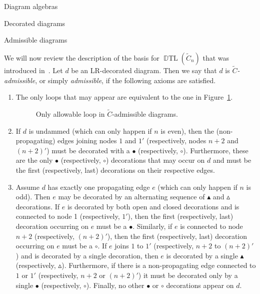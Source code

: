 \documentclass[11pt]{amsart}
\theoremstyle{definition}
\numberwithin{equation}{section}
\newcommand{\C}{\widetilde{C}}
\newcommand{\wtri}{\vartriangle}
\newcommand{\btri}{\blacktriangle}
\DeclareMathOperator{\DTL}{\mathbb{D}TL}
\newcommand{\wcirc}{\circ}
\newcommand{\bcirc}{\bullet}
\renewcommand{\(}{\left(}
\renewcommand{\)}{\right)}
\newcommand\blackwhitetrilp[2]{\draw[out=90,in=90] (#1,#2) to node[blacktri, pos=0.5]{} (#1 +1,#2) [out=-90,in=-90] to node[whitetri, pos=0.5]{} (#1,#2);}
\begin{document}
\begin{section}{Diagram algebras}
\begin{subsection}{Decorated diagrams}
\end{subsection}


\begin{subsection}{Admissible diagrams}\label{subsec:admissible}  

We will now review the description of the basis for $\DTL(\C_n)$ that was introduced in~\cite{Ernst2012}. Let $d$ be an LR-decorated diagram.  Then we say that $d$ is \emph{$\C$-admissible}, or simply \emph{admissible}, if the following axioms are satisfied.
\begin{enumerate}[label=\rm{(C\arabic*)}]
\item \label{C1} The only loops that may appear are equivalent to the one in Figure~\ref{fig:permissible loop}.
\begin{figure}[!ht]
\centering
{}
\caption{Only allowable loop in $\C$-admissible diagrams.}\label{fig:permissible loop}
\end{figure}

\item \label{C2} If $d$ is undammed (which can only happen if $n$ is even), then the (non-propagating) edges joining nodes $1$ and $1'$ (respectively, nodes $n+2$ and $(n+2)'$) must be decorated with a $\bcirc$ (respectively, $\wcirc$).  Furthermore, these are the only $\bcirc$ (respectively, $\wcirc$) decorations that may occur on $d$ and must be the first (respectively, last) decorations on their respective edges.

\item \label{C3} Assume $d$ has exactly one propagating edge $e$ (which can only happen if $n$ is odd). Then $e$ may be decorated by an alternating sequence of $\btri$ and $\wtri$ decorations.  If $e$ is decorated by both open and closed decorations and is connected to node 1 (respectively, $1'$), then the first (respectively, last) decoration occurring on $e$ must be a $\bcirc$.  Similarly, if $e$ is connected to node $n+2$ (respectively, $(n+2)'$), then the first (respectively, last) decoration occurring on $e$ must be a $\wcirc$.  If $e$ joins $1$ to $1'$ (respectively, $n+2$ to $(n+2)'$) and is decorated by a single decoration, then $e$ is decorated by a single $\btri$ (respectively, $\wtri$).  Furthermore, if there is a non-propagating edge connected to $1$ or $1'$ (respectively, $n+2$ or $(n+2)'$) it must be decorated only by a single $\bcirc$ (respectively, $\wcirc$).  Finally, no other $\bcirc$ or $\wcirc$ decorations appear on $d$.


\end{enumerate}
\end{subsection}
\end{section}
\end{document}
